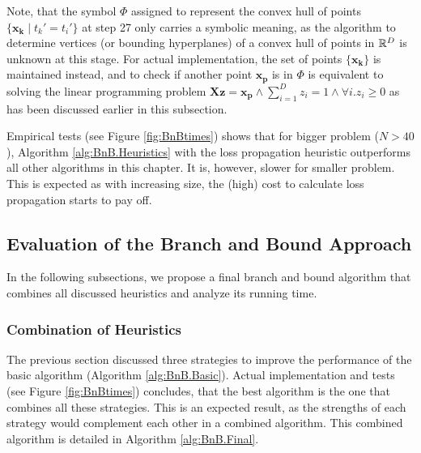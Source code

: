 Note, that the symbol $\Phi$ assigned to represent the convex hull of points $\{ \boldsymbol{x_k} \; | \; t_k'=t_i' \}$ at step 27 only carries a symbolic meaning, as the algorithm to determine vertices (or bounding hyperplanes) of a convex hull of points in $\mathbb{R}^D$ is unknown at this stage. For actual implementation, the set of points $\{ \boldsymbol{x_k} \}$ is maintained instead, and to check if another point $\boldsymbol{x_p}$ is in $\Phi$ is equivalent to solving the linear programming problem $\boldsymbol{Xz=x_p} \land \sum_{i=1}^D z_i = 1 \land \forall i. z_i \geq 0$ as has been discussed earlier in this subsection.

Empirical tests (see Figure \ref{fig:BnBtimes}) shows that for bigger problem ($N>40$), Algorithm \ref{alg:BnB.Heuristics} with the loss propagation heuristic outperforms all other algorithms in this chapter. It is, however, slower for smaller problem. This is expected as with increasing size, the (high) cost to calculate loss propagation starts to pay off. 


\subsection{Evaluation of the Branch and Bound Approach}
\label{sec:bnb.final}

In the following subsections, we propose a final branch and bound algorithm that combines all discussed heuristics and analyze its running time.

\subsubsection{Combination of Heuristics}

The previous section discussed three strategies to improve the performance of the basic algorithm (Algorithm \ref{alg:BnB.Basic}). Actual implementation and tests (see Figure \ref{fig:BnBtimes}) concludes, that the best algorithm is the one that combines all these strategies. This is an expected result, as the strengths of each strategy would complement each other in a combined algorithm. This combined algorithm is detailed in Algorithm \ref{alg:BnB.Final}.


